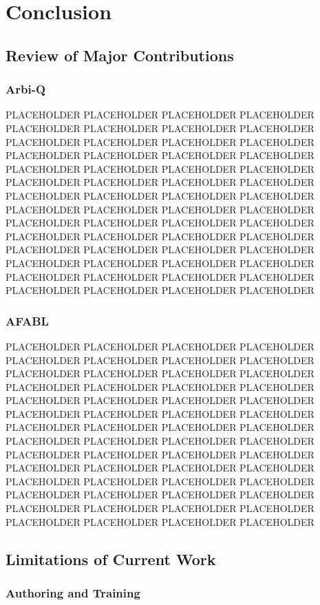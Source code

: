\chapter{Conclusion}\label{ch:conclusion}


\section{Review of Major Contributions}

\subsection{Arbi-Q}

PLACEHOLDER PLACEHOLDER PLACEHOLDER PLACEHOLDER PLACEHOLDER PLACEHOLDER PLACEHOLDER PLACEHOLDER PLACEHOLDER PLACEHOLDER PLACEHOLDER PLACEHOLDER PLACEHOLDER PLACEHOLDER PLACEHOLDER PLACEHOLDER PLACEHOLDER PLACEHOLDER PLACEHOLDER PLACEHOLDER PLACEHOLDER PLACEHOLDER PLACEHOLDER PLACEHOLDER PLACEHOLDER PLACEHOLDER PLACEHOLDER PLACEHOLDER PLACEHOLDER PLACEHOLDER PLACEHOLDER PLACEHOLDER PLACEHOLDER PLACEHOLDER PLACEHOLDER PLACEHOLDER PLACEHOLDER PLACEHOLDER PLACEHOLDER PLACEHOLDER PLACEHOLDER PLACEHOLDER PLACEHOLDER PLACEHOLDER PLACEHOLDER PLACEHOLDER PLACEHOLDER PLACEHOLDER PLACEHOLDER PLACEHOLDER PLACEHOLDER PLACEHOLDER PLACEHOLDER PLACEHOLDER PLACEHOLDER PLACEHOLDER

\subsection{AFABL}

PLACEHOLDER PLACEHOLDER PLACEHOLDER PLACEHOLDER PLACEHOLDER PLACEHOLDER PLACEHOLDER PLACEHOLDER PLACEHOLDER PLACEHOLDER PLACEHOLDER PLACEHOLDER PLACEHOLDER PLACEHOLDER PLACEHOLDER PLACEHOLDER PLACEHOLDER PLACEHOLDER PLACEHOLDER PLACEHOLDER PLACEHOLDER PLACEHOLDER PLACEHOLDER PLACEHOLDER PLACEHOLDER PLACEHOLDER PLACEHOLDER PLACEHOLDER PLACEHOLDER PLACEHOLDER PLACEHOLDER PLACEHOLDER PLACEHOLDER PLACEHOLDER PLACEHOLDER PLACEHOLDER PLACEHOLDER PLACEHOLDER PLACEHOLDER PLACEHOLDER PLACEHOLDER PLACEHOLDER PLACEHOLDER PLACEHOLDER PLACEHOLDER PLACEHOLDER PLACEHOLDER PLACEHOLDER PLACEHOLDER PLACEHOLDER PLACEHOLDER PLACEHOLDER PLACEHOLDER PLACEHOLDER PLACEHOLDER PLACEHOLDER

\section{Limitations of Current Work}

\subsection{Authoring and Training}

